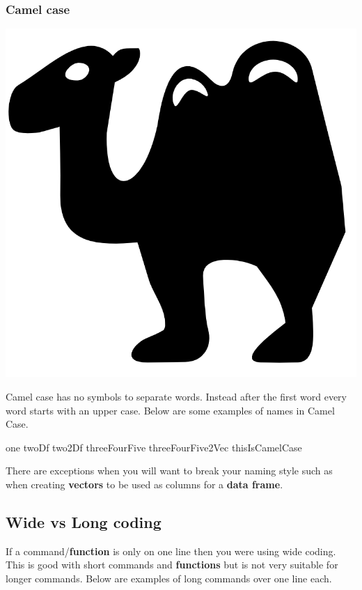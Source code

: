 \documentclass[]{book}
\newenvironment{Shaded}{\begin{snugshade}}{\end{snugshade}}
\newcommand{\NormalTok}[1]{#1}
\begin{document}
\subsubsection{Camel case}\label{camel-case}

\begin{center}\includegraphics[width=0.15\linewidth]{figures/camelCase} \end{center}

Camel case has no symbols to separate words. Instead after the first
word every word starts with an upper case. Below are some examples of
names in Camel Case.

\begin{Shaded}
\begin{Highlighting}[]
\NormalTok{one}
\NormalTok{twoDf}
\NormalTok{two2Df}
\NormalTok{threeFourFive}
\NormalTok{threeFourFive2Vec}
\NormalTok{thisIsCamelCase}
\end{Highlighting}
\end{Shaded}

There are exceptions when you will want to break your naming style such
as when creating \textbf{vectors} to be used as columns for a
\textbf{data frame}.

\subsection{Wide vs Long coding}\label{wide-vs-long-coding}

If a command/\textbf{function} is only on one line then you were using
wide coding. This is good with short commands and \textbf{functions} but
is not very suitable for longer commands. Below are examples of long
commands over one line each.
\end{document}
